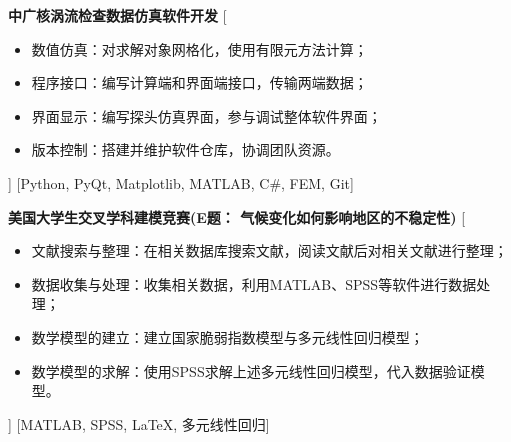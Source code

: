 \documentclass[zh]{resume}
\begin{document}
\begin{experiences}
    {\textbf{中广核涡流检查数据仿真软件开发}}%
    [%
        \begin{itemize}
            \item {数值仿真：对求解对象网格化，使用有限元方法计算；}
            \item {程序接口：编写计算端和界面端接口，传输两端数据；}
            \item {界面显示：编写探头仿真界面，参与调试整体软件界面；}
            \item {版本控制：搭建并维护软件仓库，协调团队资源。}
        \end{itemize}]
    [Python, PyQt, Matplotlib, MATLAB, C\#, FEM, Git]
    \separator{0.5ex}


    {\textbf{美国大学生交叉学科建模竞赛(E题： 气候变化如何影响地区的不稳定性)}}%
    [%
        \begin{itemize}
            \item {文献搜索与整理：在相关数据库搜索文献，阅读文献后对相关文献进行整理；}
            \item {数据收集与处理：收集相关数据，利用MATLAB、SPSS等软件进行数据处理；}
            \item {数学模型的建立：建立国家脆弱指数模型与多元线性回归模型；}
            \item {数学模型的求解：使用SPSS求解上述多元线性回归模型，代入数据验证模型。}
        \end{itemize}]
    [MATLAB, SPSS, \LaTeX, 多元线性回归]
    \separator{0.5ex}


\end{experiences}
\end{document}
